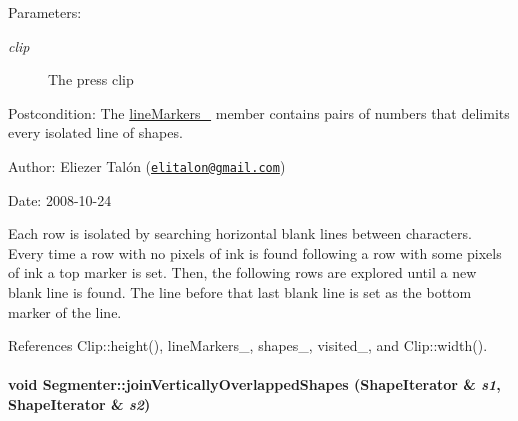 \begin{Desc}
\item[Parameters:]
\begin{description}
\item[{\em clip}]The press clip\end{description}
\end{Desc}
\begin{Desc}
\item[Postcondition:]The \hyperlink{class_segmenter_2789fd760ed7604765b3b147be454c09}{lineMarkers\_\-} member contains pairs of numbers that delimits every isolated line of shapes.\end{Desc}
\begin{Desc}
\item[Author:]Eliezer Talón (\href{mailto:elitalon@gmail.com}{\tt elitalon@gmail.com}) \end{Desc}
\begin{Desc}
\item[Date:]2008-10-24\end{Desc}
Each row is isolated by searching horizontal blank lines between characters. Every time a row with no pixels of ink is found following a row with some pixels of ink a top marker is set. Then, the following rows are explored until a new blank line is found. The line before that last blank line is set as the bottom marker of the line. 

References Clip::height(), lineMarkers\_\-, shapes\_\-, visited\_\-, and Clip::width().\hypertarget{class_segmenter_a6fc98922155143cf36f542118c33f3a}{
\paragraph[joinVerticallyOverlappedShapes]{\setlength{\rightskip}{0pt plus 5cm}void Segmenter::joinVerticallyOverlappedShapes ({\bf ShapeIterator} \& {\em s1}, \/  {\bf ShapeIterator} \& {\em s2})}\hfill}
\label{class_segmenter_a6fc98922155143cf36f542118c33f3a}


